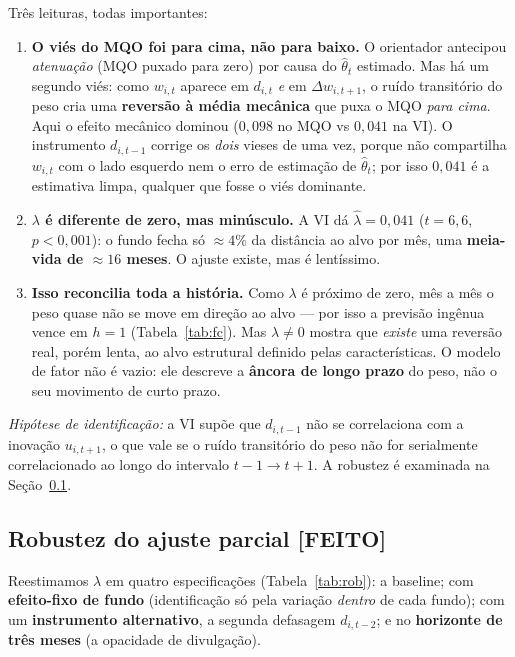\documentclass[11pt,a4paper]{article}
\newcommand{\feito}{\textcolor{feitog}{\textbf{[FEITO]}}}
\begin{document}
\noindent Três leituras, todas importantes:
\begin{enumerate}[topsep=2pt,itemsep=1pt]
\item \textbf{O viés do MQO foi para cima, não para baixo.} O orientador antecipou
\emph{atenuação} (MQO puxado para zero) por causa do $\widehat{\theta}_t$ estimado. Mas há um
segundo viés: como $w_{i,t}$ aparece em $d_{i,t}$ \emph{e} em $\Delta w_{i,t+1}$, o ruído
transitório do peso cria uma \textbf{reversão à média mecânica} que puxa o MQO \emph{para cima}.
Aqui o efeito mecânico dominou ($0{,}098$ no MQO vs $0{,}041$ na VI). O instrumento $d_{i,t-1}$
corrige os \emph{dois} vieses de uma vez, porque não compartilha $w_{i,t}$ com o lado esquerdo nem
o erro de estimação de $\widehat{\theta}_t$; por isso $0{,}041$ é a estimativa limpa, qualquer que
fosse o viés dominante.
\item \textbf{$\lambda$ é diferente de zero, mas minúsculo.} A VI dá $\widehat{\lambda}=0{,}041$
($t=6{,}6$, $p<0{,}001$): o fundo fecha só $\approx4\%$ da distância ao alvo por mês, uma
\textbf{meia-vida de $\approx16$ meses}. O ajuste existe, mas é lentíssimo.
\item \textbf{Isso reconcilia toda a história.} Como $\lambda$ é próximo de zero, mês a mês o peso
quase não se move em direção ao alvo --- por isso a previsão ingênua vence em $h=1$
(Tabela~\ref{tab:fc}). Mas $\lambda\neq0$ mostra que \emph{existe} uma reversão real, porém lenta,
ao alvo estrutural definido pelas características. O modelo de fator não é vazio: ele descreve a
\textbf{âncora de longo prazo} do peso, não o seu movimento de curto prazo.
\end{enumerate}
\emph{Hipótese de identificação:} a VI supõe que $d_{i,t-1}$ não se correlaciona com a inovação
$u_{i,t+1}$, o que vale se o ruído transitório do peso não for serialmente correlacionado ao longo
do intervalo $t{-}1\to t{+}1$. A robustez é examinada na Seção~\ref{sec:rob}.

\subsection{Robustez do ajuste parcial \feito}
\label{sec:rob}
Reestimamos $\lambda$ em quatro especificações (Tabela~\ref{tab:rob}): a baseline; com
\textbf{efeito-fixo de fundo} (identificação só pela variação \emph{dentro} de cada fundo); com um
\textbf{instrumento alternativo}, a segunda defasagem $d_{i,t-2}$; e no \textbf{horizonte de três
meses} (a opacidade de divulgação).
\end{document}
